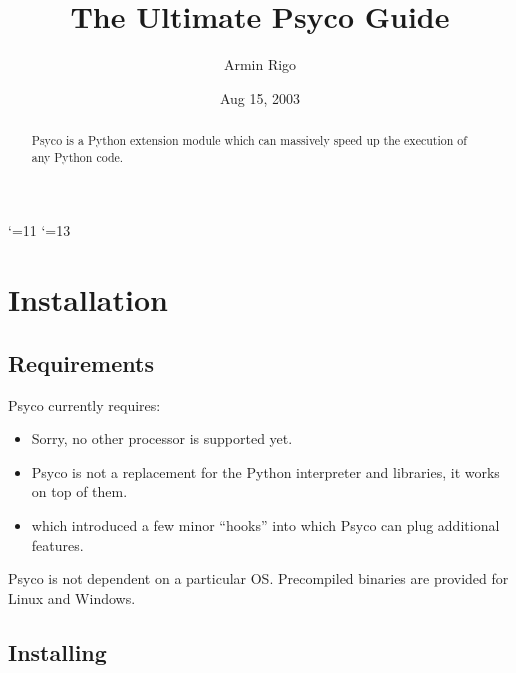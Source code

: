 \documentclass{manual}
\title{The Ultimate Psyco Guide}
\author{Armin Rigo}
\date{Aug 15, 2003}
\begin{document}
\catcode`\@=11
\renewcommand{\py@reset}{}
\catcode`\@=13

\maketitle


\begin{abstract}

\noindent
Psyco is a Python extension module which can massively speed up the execution of any Python code.


\end{abstract}

\tableofcontents


\chapter{Installation}

\section{Requirements}\label{req}

Psyco currently requires:

\begin{itemize}
  
\item {}  Sorry, no other processor is supported yet.
  
\item {}  Psyco is not a replacement for the Python interpreter and libraries, it works on top of them.
  
\item {} which introduced a few minor ``hooks'' into which Psyco can plug additional features.
  
\end{itemize}

Psyco is not dependent on a particular OS.  Precompiled binaries are provided for Linux and Windows.


\section{Installing}\label{binaries}
\end{document}
